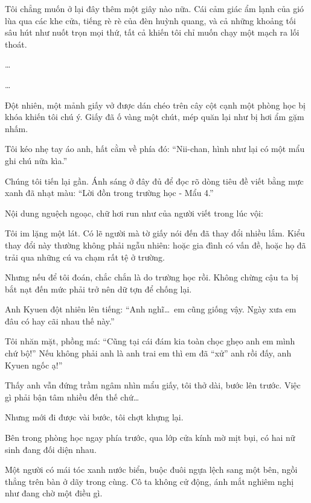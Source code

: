 \documentclass[../main.tex]{subfiles}
\begin{document}
Tôi chẳng muốn ở lại đây thêm một giây nào nữa. Cái cảm giác ẩm lạnh của gió lùa qua các khe cửa, tiếng rè rè của đèn huỳnh quang, và cả những khoảng tối sâu hút như nuốt trọn mọi thứ, tất cả khiến tôi chỉ muốn chạy một mạch ra lối thoát.

\dots

\dots

Đột nhiên, một mảnh giấy vở được dán chéo trên cây cột cạnh một phòng học bị khóa khiến tôi chú ý. Giấy đã ố vàng một chút, mép quăn lại như bị hơi ẩm gặm nhấm.

Tôi kéo nhẹ tay áo anh, hất cằm về phía đó: ``Nii-chan, hình như lại có một mẩu ghi chú nữa kìa.''

Chúng tôi tiến lại gần. Ánh sáng ở đây đủ để đọc rõ dòng tiêu đề viết bằng mực xanh đã nhạt màu: ``{\vnmsans Lời đồn trong trường học - Mẩu 4.}''

Nội dung nguệch ngoạc, chữ hơi run như của người viết trong lúc vội:


Tôi im lặng một lát. Có lẽ người mà tờ giấy nói đến đã thay đổi nhiều lắm. Kiểu thay đổi này thường không phải ngẫu nhiên: hoặc gia đình có vấn đề, hoặc họ đã trải qua những cú va chạm rất tệ ở trường.

Nhưng nếu để tôi đoán, chắc chắn là do trường học rồi. Không chừng cậu ta bị bắt nạt đến mức phải trở nên dữ tợn để chống lại.

Anh Kyuen đột nhiên lên tiếng: ``Anh nghĩ\dots\ em cũng giống vậy. Ngày xưa em đâu có hay cãi nhau thế này.''

Tôi nhăn mặt, phồng má: ``Cũng tại cái đám kia toàn chọc ghẹo anh em mình chứ bộ!'' Nếu không phải anh là anh trai em thì em đã ``xử'' anh rồi đấy, anh Kyuen ngốc ạ!''

Thấy anh vẫn đứng trầm ngâm nhìn mẩu giấy, tôi thở dài, bước lên trước. Việc gì phải bận tâm nhiều đến thế chứ\dots

Nhưng mới đi được vài bước, tôi chợt khựng lại.

Bên trong phòng học ngay phía trước, qua lớp cửa kính mờ mịt bụi, có hai nữ sinh đang đối diện nhau.


Một người có mái tóc xanh nước biển, buộc đuôi ngựa lệch sang một bên, ngồi thẳng trên bàn ở dãy trong cùng. Cô ta không cử động, ánh mắt nghiêm nghị như đang chờ một điều gì.
\end{document}
